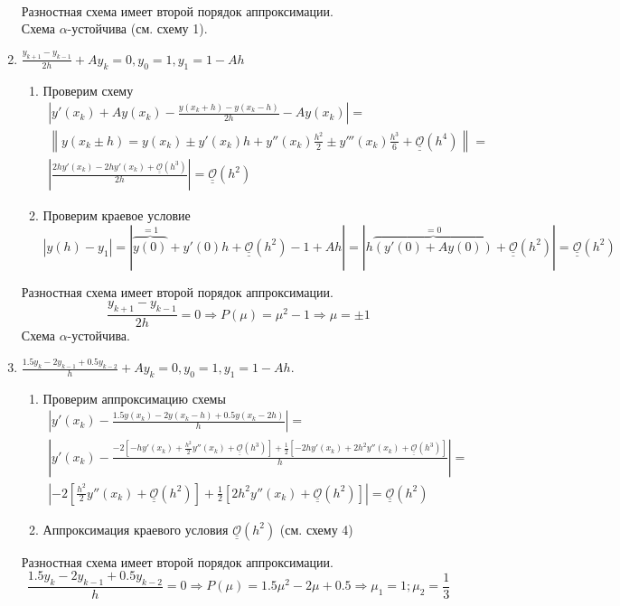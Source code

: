 \documentclass[12pt]{article}
\def\bigO{ \underline{\underline{\mathcal{O}}} }
\begin{document}
\begin{enumerate}
\begin{multline*}
	      \end{multline*}
	      Разностная схема имеет второй порядок аппроксимации. \\
	      Схема $\alpha$-устойчива (см. схему 1).
	\item $\frac{y_{k+1} - y_{k-1}}{2h} + Ay_k = 0, y_0 = 1, y_1 = 1 - Ah$
	      \begin{enumerate}
		      \item Проверим схему
		            \begin{multline*}
			            \left|y'(x_k)+Ay(x_k)-\frac{y(x_k+h)-y(x_k-h)}{2h}-Ay(x_k)\right|=\\
			            \left\|y(x_k\pm h)=y(x_k)\pm y'(x_k)h + y''(x_k)\frac{h^2}{2}\pm y'''(x_k)\frac{h^3}{6}+\bigO(h^4)\right\| = \\
			            \left|\frac{2hy'(x_k)-2hy'(x_k)+\bigO(h^3)}{2h}\right| = \bigO(h^2)
		            \end{multline*}
		      \item Проверим краевое условие
		            \[|y(h)-y_1|=|\overbrace{y(0)}^{=1}+y'(0)h+\bigO(h^2)-1+Ah|=|h\overbrace{(y'(0)+Ay(0))}^{=0}+\bigO(h^2)|=\bigO(h^2)\]
	      \end{enumerate}
	      Разностная схема имеет второй порядок аппроксимации.
	      \[\frac{y_{k+1}-y_{k-1}}{2h}=0\Rightarrow P(\mu)=\mu^2-1\Rightarrow \mu=\pm 1\]
	      Схема $\alpha$-устойчива.
	\item $\frac{1.5y_{k} - 2y_{k-1} + 0.5y_{k-2}}{h}+Ay_k= 0, y_0 = 1, y_1 = 1 - Ah.$
	      \begin{enumerate}
		      \item Проверим аппроксимацию схемы
		            \begin{multline*}
			            \left|y'(x_k)-\frac{1.5y(x_k)-2y(x_k-h)+0.5y(x_k-2h)}{h}\right|=\\
			            \left|y'(x_k)-\frac{-2\left[-hy'(x_k)+\frac{h^2}{2}y''(x_k)+\bigO(h^3)\right]+\frac{1}{2}\left[-2hy'(x_k)+2h^2y''(x_k)+\bigO(h^3)\right]}{h}\right|=\\
			            \left|-2\left[\frac{h^2}{2}y''(x_k)+\bigO(h^2)\right]+\frac{1}{2}\left[2h^2y''(x_k)+\bigO(h^2)\right]\right|=\bigO(h^2)
		            \end{multline*}
		      \item Аппроксимация краевого условия $\bigO(h^2)$ (см. схему 4)
	      \end{enumerate}
	      Разностная схема имеет второй порядок аппроксимации.
	      \[\frac{1.5y_k-2y_{k-1}+0.5y_{k-2}}{h}=0\Rightarrow P(\mu)=1.5\mu^2-2\mu+0.5\Rightarrow\mu_1=1;\mu_2=\frac{1}{3}\]

\end{enumerate}
\end{document}
